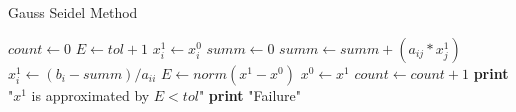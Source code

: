 \documentclass{article}
\begin{document}
  \begin{algorithm}
    \caption{Gauss Seidel Method}
    \begin{algorithmic}[1]
        \State $count \gets 0$
        \State $E \gets tol + 1$
            \State $x_{i}^{1} \gets x_{i}^{0}$
          \EndFor
            \State $summ \gets 0$
                \State $summ \gets summ + (a_{ij} * x_{j}^{1})$
              \EndIf
            \EndFor
            \State $x_{i}^{1} \gets (b_{i} - summ) / a_{ii}$
          \EndFor
          \State $E \gets norm(x^{1} - x^{0})$
          \State $x^{0} \gets x^{1}$
          \State $count \gets count + 1$
        \EndWhile
          \State \textbf{print} "$x^{1}$ is approximated by $E < tol$"
        \Else
            \State \textbf{print} "Failure"
        \EndIf
      \EndProcedure
    \end{algorithmic}
  \end{algorithm}
\end{document}

